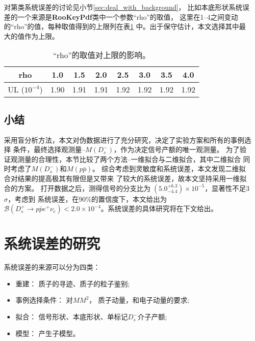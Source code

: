 对第类系统误差的讨论见小节\ref{sec:deal_with_background}，
比如本底形状系统误差的一个来源是\textbf{RooKeyPdf}类中一个参数``rho''的取值，
这里在1--4之间变动的``rho''的值，每种取值得到的上限列在表\ref{tab:vary_rho}
中。出于保守估计，本文选择其中最大的值作为上限。
\begin{table}[htbp]
    \caption{``rho''的取值对上限的影响。}%
    \label{tab:vary_rho}
    \begin{center}
        \begin{tabular} {c  c c c c c c c }
            \toprule 
            rho  &  1.0 & 1.5 & 2.0 & 2.5 & 3.0 & 3.5 & 4.0 \\
            \midrule  
            UL ($10^{-4}$) & 1.90 & 1.91 & 1.91 & 1.92 & 1.92 & 1.92
            &1.92 \\
            \bottomrule
        \end{tabular}
    \end{center}
\end{table}

\subsection{小结}
采用盲分析方法，本文对伪数据进行了充分研究，决定了实验方案和所有的事例选择
条件，最终选择观测量--$M(D_{s}^{-})$，作为决定信号产额的唯一观测量。
为了验证观测量的合理性，本节比较了两个方法--一维拟合与二维拟合，其中二维拟合
同时考虑了$M(D_{s}^{-})$和$M(p\bar{p})$。
综合考虑到灵敏度和系统误差，本文发现二维拟合对结果的提高极其有限但是又带来
了较大的系统误差，故本文坚持采用一维拟合的方案。
打开数据之后，测得信号的分支比为
$( 5.0 ^{+ 6.3}_{-4.4} ) \times 10^{-5}$，显著性不足3$\sigma$，考虑到
系统误差，在90\%的置信度下，本文给出为
$\mathcal{B}(D_{s}^{+} \to p \bar{p} e^{+} \nu_{e}) < 2.0\times
10^{-4}$。系统误差的具体研究将在下文给出。 

\section{系统误差的研究}%
\label{sec:Systematic_Uncertainties}
系统误差的来源可以分为四类：
\begin{itemize}
    \item 重建：
    质子的寻迹、质子的粒子鉴别;
    \item 事例选择条件：
        对$MM^{2}$， 质子动量，和电子动量的要求;
    \item 拟合：
        信号形状、本底形状、单标记$D_{s}^{-}$介子产额;
    \item 模型：
        产生子模型。
\end{itemize}

